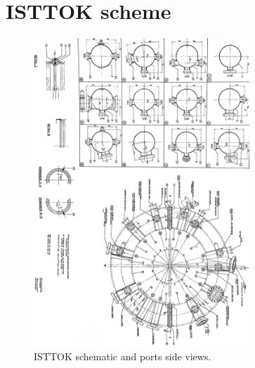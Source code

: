 \chapter{ISTTOK scheme}
\label{ISTTOK_scheme}

\begin{figure}[h]
	\centering
	\includegraphics[width=0.723\textwidth]{AppCont/isttok_schematic_1.png}
	\caption{ ISTTOK schematic and ports side views. \label{ISTTOK_schema}}
\end{figure}